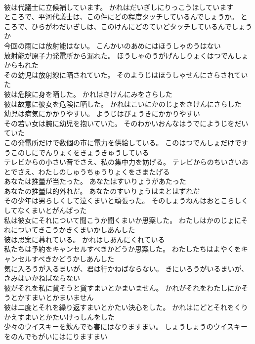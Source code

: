 \documentclass[8pt]{extreport}
\begin{document}
\begin{CJK}{UTF8}{min}
\\	彼は代議士に立候補しています。	かれはだいぎしにりっこうほしています 
\\	ところで、平河代議士は、この件にどの程度タッチしているんでしょうか。	ところで、ひらがわだいぎしは、このけんにどのていどタッチしているんでしょうか 
\\	今回の雨には放射能はない。	こんかいのあめにはほうしゃのうはない 
\\	放射能が原子力発電所から漏れた。	ほうしゃのうがげんしりょくはつでんしょからもれた 
\\	その幼児は放射線に晒されていた。	そのようじはほうしゃせんにさらされていた 
\\	彼は危険に身を晒した。	かれはきけんにみをさらした 
\\	彼は故意に彼女を危険に晒した。	かれはこいにかのじょをきけんにさらした 
\\	幼児は病気にかかりやすい。	ようじはびょうきにかかりやすい 
\\	その若い女は腕に幼児を抱いていた。	そのわかいおんなはうでにようじをだいていた 
\\	この発電所だけで数個の市に電力を供給している。	このはつでんしょだけですうこのしにでんりょくをきょうきゅうしている 
\\	テレビからの小さい音でさえ、私の集中力を妨げる。	テレビからのちいさいおとでさえ、わたしのしゅうちゅうりょくをさまたげる 
\\	あなたは推量が当たった。	あなたはすいりょうがあたった 
\\	あなたの推量は的外れだ。	あなたのすいりょうはまとはずれだ 
\\	その少年は男らしくして泣くまいと頑張った。	そのしょうねんはおとこらしくしてなくまいとがんばった 
\\	私は彼女にそれについて聞こうか聞くまいか思案した。	わたしはかのじょにそれについてきこうかきくまいかしあんした 
\\	彼は思案に暮れている。	かれはしあんにくれている 
\\	私たちは予約をキャンセルすべきかどうか思案した。	わたしたちはよやくをキャンセルすべきかどうかしあんした 
\\	気に入ろうが入るまいが、君は行かねばならない。	きにいろうがいるまいが、きみはいかねばならない 
\\	彼がそれを私に貸そうと貸すまいとかまいません。	かれがそれをわたしにかそうとかすまいとかまいません 
\\	彼は二度とそれを繰り返すまいとかたい決心をした。	かれはにどとそれをくりかえすまいとかたいけっしんをした 
\\	少々のウイスキーを飲んでも害にはなりますまい。	しょうしょうのウイスキーをのんでもがいにはにりますまい 

\end{CJK}
\end{document}
